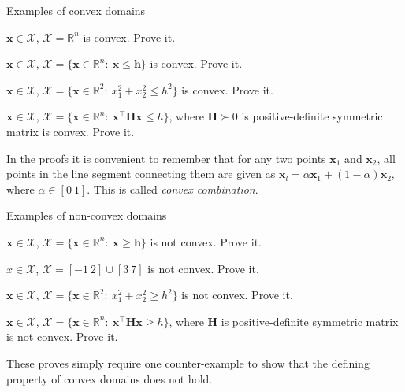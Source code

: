 \documentclass{beamer}
\begin{document}
\begin{frame}{Examples of convex domains}
\begin{flushleft}

$\mathbf{x} \in \mathcal{X}$, $\mathcal{X} = \mathbb{R}^n$  is convex. Prove it.

\bigskip

$\mathbf{x} \in \mathcal{X}$, $\mathcal{X} = \{ \mathbf{x} \in \mathbb{R}^n: \ \mathbf{x} \leq \mathbf{h} \}$ is convex. Prove it.

\bigskip

$\mathbf{x} \in \mathcal{X}$, $\mathcal{X} = \{ \mathbf{x} \in \mathbb{R}^2: \ x_1^2+x_2^2 \leq h^2 \}$ is convex. Prove it.

\bigskip

$\mathbf{x} \in \mathcal{X}$, $\mathcal{X} = \{ \mathbf{x} \in \mathbb{R}^n: \ \mathbf{x}^\top \mathbf{H} \mathbf{x} \leq h \}$, where $\mathbf{H} \succ 0$ is positive-definite symmetric matrix is convex. Prove it.

\bigskip

In the proofs it is convenient to remember that for any two points $\mathbf{x}_1$ and $\mathbf{x}_2$, all points in the line segment connecting them are given as $\mathbf{x}_l = \alpha \mathbf{x}_1 + (1 - \alpha) \mathbf{x}_2$, where $\alpha \in [0 \ 1]$. This is called \emph{convex combination}.
 
\end{flushleft}
\end{frame}


\begin{frame}{Examples of non-convex domains}
\begin{flushleft}

$\mathbf{x} \in \mathcal{X}$, $\mathcal{X} = \{ \mathbf{x} \in \mathbb{R}^n: \ \mathbf{x} \geq \mathbf{h} \}$ is not convex. Prove it.

\bigskip

$x \in \mathcal{X}$, $\mathcal{X} = [-1 \ 2] \cup [3 \ 7]$ is not convex. Prove it.

\bigskip

$\mathbf{x} \in \mathcal{X}$, $\mathcal{X} = \{ \mathbf{x} \in \mathbb{R}^2: \ x_1^2+x_2^2 \geq h^2 \}$ is not convex. Prove it.

\bigskip

$\mathbf{x} \in \mathcal{X}$, $\mathcal{X} = \{ \mathbf{x} \in \mathbb{R}^n: \ \mathbf{x}^\top \mathbf{H} \mathbf{x} \geq h \}$, where $\mathbf{H}$ is positive-definite symmetric matrix is not convex. Prove it.

\bigskip

These proves simply require one counter-example to show that the defining property of convex domains does not hold.
 
\end{flushleft}
\end{frame}
\end{document}
